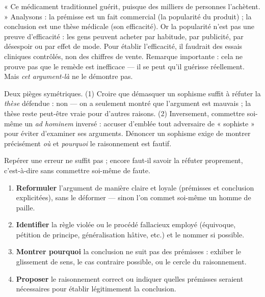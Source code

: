 \documentclass[11pt]{article}
\newcounter{popsec}
\newcounter{popsub}
\newcommand{\courssub}[1]{%
  \stepcounter{popsub}%
  \par\vspace{9pt}\noindent{\popxbold\fontsize{11.5}{13}\selectfont\color{popink}{\color{poporange}\thepopsec.\thepopsub}\hspace{6pt}#1}\par\nopagebreak\vspace{4pt}
}
\begin{document}
\begin{exemplebox}
« Ce médicament traditionnel guérit, puisque des milliers de personnes l'achètent. » Analysons : la prémisse est un fait commercial (la popularité du produit) ; la conclusion est une thèse médicale (son efficacité). Or la popularité n'est pas une preuve d'efficacité : les gens peuvent acheter par habitude, par publicité, par désespoir ou par effet de mode. Pour établir l'efficacité, il faudrait des essais cliniques contrôlés, non des chiffres de vente. Remarque importante : cela ne prouve pas que le remède est inefficace — il se peut qu'il guérisse réellement. Mais \emph{cet argument-là} ne le démontre pas.
\end{exemplebox}

\begin{attention}
Deux pièges symétriques. (1) Croire que démasquer un sophisme suffit à réfuter la \emph{thèse} défendue : non — on a seulement montré que l'argument est mauvais ; la thèse reste peut-être vraie pour d'autres raisons. (2) Inversement, commettre soi-même un \emph{ad hominem} inversé : accuser d'emblée tout adversaire de « sophiste » pour éviter d'examiner ses arguments. Dénoncer un sophisme exige de montrer précisément \emph{où} et \emph{pourquoi} le raisonnement est fautif.
\end{attention}

\courssub{Réfuter un sophisme : la méthode}

Repérer une erreur ne suffit pas ; encore faut-il savoir la réfuter proprement, c'est-à-dire sans commettre soi-même de faute.

\begin{methode}
\begin{enumerate}
\item \textbf{Reformuler} l'argument de manière claire et loyale (prémisses et conclusion explicitées), sans le déformer — sinon l'on commet soi-même un homme de paille.
\item \textbf{Identifier} la règle violée ou le procédé fallacieux employé (équivoque, pétition de principe, généralisation hâtive, etc.) et le nommer si possible.
\item \textbf{Montrer pourquoi} la conclusion ne suit pas des prémisses : exhiber le glissement de sens, le cas contraire possible, ou le cercle du raisonnement.
\item \textbf{Proposer} le raisonnement correct ou indiquer quelles prémisses seraient nécessaires pour établir légitimement la conclusion.
\end{enumerate}
\end{methode}
\end{document}
